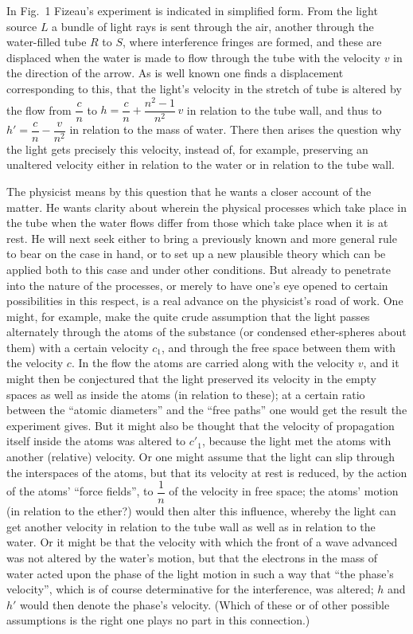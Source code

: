 \documentclass[12pt,a4paper]{article}
\begin{document}
In Fig.~1 Fizeau's experiment is indicated in simplified form. From the light
source $L$ a bundle of light rays is sent through the air, another through the
water-filled tube $R$ to $S$, where interference fringes are formed, and these
are displaced when the water is made to flow through the tube with the
velocity $v$ in the direction of the arrow. As is well known one finds a
displacement corresponding to this, that the light's velocity in the stretch
of tube is altered by the flow from $\dfrac{c}{n}$ to
$h = \dfrac{c}{n} + \dfrac{n^{2}-1}{n^{2}}\,v$ in relation to the tube wall,
and thus to $h' = \dfrac{c}{n} - \dfrac{v}{n^{2}}$ in relation to the mass of
water. There then arises the question why the light gets precisely this
velocity, instead of, for example, preserving an unaltered velocity either in
relation to the water or in relation to the tube wall.

The physicist means by this question that he wants a closer account of the
matter. He wants clarity about wherein the physical processes which take place
in the tube when the water flows differ from those which take place when it is
at rest. He will next seek either
to bring a previously known and more general rule to bear on the case in hand,
or to set up a new plausible theory which can be applied both to this case and
under other conditions. But already to penetrate into the nature of the
processes, or merely to have one's eye opened to certain possibilities in this
respect, is a real advance on the physicist's road of work. One might, for
example, make the quite crude assumption that the light passes alternately
through the atoms of the substance (or condensed ether-spheres about them)
with a certain velocity $c_{1}$, and through the free space between them with
the velocity $c$. In the flow the atoms are carried along with the velocity
$v$, and it might then be conjectured that the light preserved its velocity in
the empty spaces as well as inside the atoms (in relation to these); at a
certain ratio between the ``atomic diameters'' and the ``free paths'' one
would get the result the experiment gives. But it might also be thought that
the velocity of propagation itself inside the atoms was altered to $c'_{1}$,
because the light met the atoms with another (relative) velocity. Or one might
assume that the light can slip through the interspaces of the atoms, but that
its velocity at rest is reduced, by the action of the atoms' ``force fields'',
to $\dfrac{1}{n}$ of the velocity in free space; the atoms' motion (in
relation to the ether?) would then alter this influence, whereby the light can
get another velocity in relation to the tube wall as well as in relation to
the water. Or it might be that the velocity with which the front of a wave
advanced was not altered by the water's motion, but that the electrons in the
mass of water acted upon the phase of the light motion in such a way that
``the phase's velocity'', which is of course determinative for the
interference, was altered; $h$ and $h'$ would then denote the phase's
velocity. (Which of these or of other possible assumptions is the right one
plays no part in this connection.)
\end{document}
